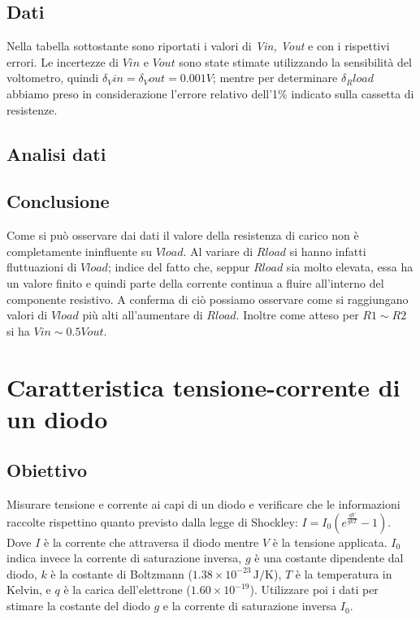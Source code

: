 \documentclass[a4paper]{article}
\begin{document}
\subsection{Dati}
Nella tabella sottostante sono riportati i valori di \emph{Vin, Vout} e  con i rispettivi errori.
Le incertezze di \( \mathit{Vin} \) e \( \mathit{Vout} \) sono state stimate utilizzando la sensibilità del voltometro, quindi \( \mathit{\delta_Vin=\delta_Vout=0.001 V} \);
mentre per determinare \( \mathit{\delta_Rload} \) abbiamo preso in considerazione l'errore relativo dell'1\% indicato sulla cassetta di resistenze.
\subsection{Analisi dati}
\subsection{Conclusione}
Come si può osservare dai dati il valore della resistenza di carico non è completamente ininfluente su \( \mathit{Vload} \).
Al variare di \( \mathit{Rload} \) si hanno infatti fluttuazioni di \( \mathit{Vload} \); indice del fatto che, seppur \( \mathit{Rload} \) sia molto elevata, essa ha un valore finito e quindi
parte della corrente continua a fluire all'interno del componente resistivo. A conferma di ciò possiamo osservare come si raggiungano valori di \( \mathit{Vload} \) più alti all'aumentare di \( \mathit{Rload} \).
Inoltre come atteso per \( \mathit{R1∼R2} \) si ha \( \mathit{Vin ∼ 0.5Vout} \).

\section{Caratteristica tensione-corrente di un diodo}
\subsection{Obiettivo}
Misurare tensione e corrente ai capi di un diodo e verificare che le informazioni raccolte rispettino quanto previsto dalla legge di Shockley: \(I = I_0 \left( e^{\frac{qV}{gkT}} - 1 \right)\).
Dove \( I \) è la corrente che attraversa il diodo mentre \( V \) è la tensione applicata. \( I_0 \) indica invece la corrente di saturazione inversa, \( g \) è una costante dipendente dal diodo,
\( k \) è la costante di Boltzmann (\( 1.38 \times 10^{-23} \, \text{J/K} \)), \( T \) è la temperatura in Kelvin, e \( q \) è la carica dell'elettrone (\( 1.60 \times 10^{-19} \)).
Utilizzare poi i dati per stimare la costante del diodo \( g \) e la corrente di saturazione inversa \( I_0 \).
\end{document}

